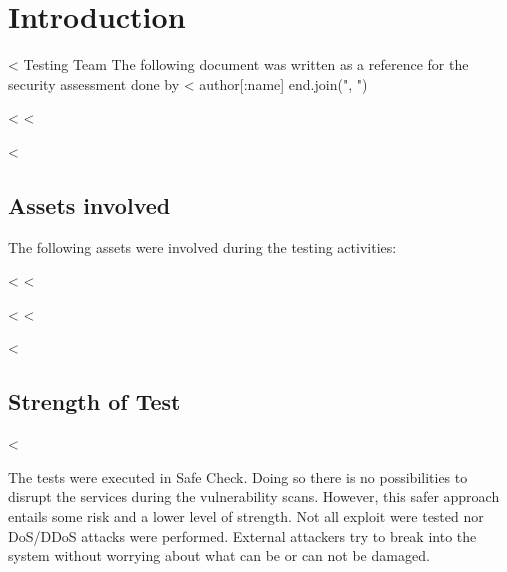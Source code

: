 

\chapter{Introduction}\label{cha:introduction}

  <%
         Testing Team %
  The following document was written as a reference for the security
  assessment done by <%
    author[:name]
  end.join(", ") %

  <%
  <%

  <%
  \section{Assets involved}\label{sec:assets-involved}

    The following assets were involved during the testing activities:

    \begin{itemize}
      <%
        <%
          \item \textbf{<%
        <%
          \item \textbf{<%
        <%
      <%
    \end{itemize}

  <%
  <%

  <%
  <%

  <%
  \section{Strength of Test}\label{sec:strength-test}

  <%

  The tests were executed in Safe Check. Doing so there is no possibilities to
  disrupt the services during the vulnerability scans. However, this safer
  approach entails some risk and a lower level of strength. Not all exploit were
  tested nor DoS/DDoS attacks were performed. External attackers try to break
  into the system without worrying about what can be or can not be damaged.

